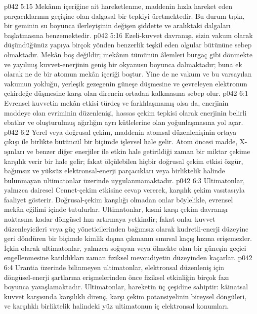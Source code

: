 \vs p042 5:15 Mekânın içeriğine ait hareketlenme, maddenin hızla hareket eden parçacıklarının geçişine olan dalgasal bir tepkiyi üretmektedir. Bu durum tıpkı, bir geminin su boyunca ilerleyişinin değişen şiddette ve aralıktaki dalgaları başlatmasına benzemektedir.
\vs p042 5:16 Ezeli\hyp{}kuvvet davranışı, sizin vakum olarak düşündüğünüz yapıya birçok yönden benzerlik teşkil eden olgular bütününe sebep olmaktadır. Mekân boş değildir; mekânın tümünün âlemleri burgaç gibi dönmekte ve yayılmış kuvvet\hyp{}enerjinin geniş bir okyanusu boyunca dalmaktadır; buna ek olarak ne de bir atomun mekân içeriği boştur. Yine de ne vakum ve bu varsayılan vakumun yokluğu, yerleşik gezegenin güneşe düşmesine ve çevreleyen elektronun çekirdeğe düşmesine karşı olan direncin ortadan kalkmasına sebep olur.
\vs p042 6:1 Evrensel kuvvetin mekân etkisi türdeş ve farklılaşmamış olsa da, enerjinin maddeye olan evriminin düzenlenişi, hassas çekim tepkisi olarak enerjinin belirli ebatlar ve oluşturulmuş ağırlığın ayrı kütlelerine olan yoğunlaşmasına yol açar.
\vs p042 6:2 Yerel veya doğrusal çekim, maddenin atomsal düzenlenişinin ortaya çıkışı ile birlikte bütüncül bir biçimde işlevsel hale gelir. Atom öncesi madde, X\hyp{}ışınları ve benzer diğer enerjiler ile etkin hale getirildiği zaman bir miktar çekime karşılık verir bir hale gelir; fakat ölçülebilen hiçbir doğrusal çekim etkisi özgür, bağımsız ve yüksüz elektronsal\hyp{}enerji parçacıkları veya birliktelik halinde bulunmayan ultimatonlar üzerinde uygulanmamaktadır.
\vs p042 6:3 Ultimatonlar, yalnızca dairesel Cennet\hyp{}çekim etkisine cevap vererek, karşılık çekim vasıtasıyla faaliyet gösterir. Doğrusal\hyp{}çekim karşılığı olmadan onlar böylelikle, evrensel mekân eğilimi içinde tutulurlar. Ultimatonlar, kısmi karşı çekim davranışı noktasına kadar döngüsel hızı artırmaya yetkindir; fakat onlar kuvvet düzenleyicileri veya güç yöneticilerinden bağımsız olarak kudretli\hyp{}enerji düzeyine geri döndüren bir biçimde kimlik dışına çıkmanın sınırsal kaçış hızına erişemezler. İçkin olarak ultimatonlar, yalnızca soğuyan veya ölmekte olan bir güneşin geçici engellenmesine katıldıkları zaman fiziksel mevcudiyetin düzeyinden kaçarlar.
\vs p042 6:4 Urantia üzerinde bilinmeyen ultimatonlar, elektronsal düzenleniş için döngüsel\hyp{}enerji şartlarına erişmelerinden önce fiziksel etkinliğin birçok fazı boyunca yavaşlamaktadır. Ultimatonlar, hareketin üç çeşidine sahiptir: kâinatsal kuvvet karşısında karşılıklı direnç, karşı çekim potansiyelinin bireysel döngüleri, ve karşılıklı birliktelik halindeki yüz ultimatonun iç elektronsal konumları.
